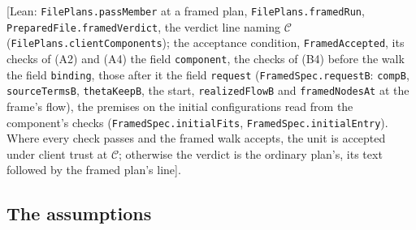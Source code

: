 \documentclass[10pt,a4paper]{article}
\theoremstyle{definition}
\theoremstyle{remark}
\newcommand{\lean}[1]{\texttt{\small #1}}
\newcommand{\status}[1]{\textsf{\small[#1]}}
\newcommand{\cC}{\mathcal{C}}
\begin{document}
\begin{description}[leftmargin=1.5em,style=nextline]
\status{Lean: \lean{FilePlans.passMember} at a framed plan, \lean{FilePlans.framedRun}, \lean{PreparedFile.framedVerdict}, the verdict line naming $\cC$ (\lean{FilePlans.clientComponents}); the acceptance condition, \lean{FramedAccepted}, its checks of (A2) and (A4) the field \lean{component}, the checks of (B4) before the walk the field \lean{binding}, those after it the field \lean{request} (\lean{FramedSpec.requestB}: \lean{compB}, \lean{sourceTermsB}, \lean{thetaKeepB}, the start, \lean{realizedFlowB} and \lean{framedNodesAt} at the frame's flow), the premises on the initial configurations read from the component's checks (\lean{FramedSpec.initialFits}, \lean{FramedSpec.initialEntry}). Where every check passes and the framed walk accepts, the unit is accepted under client trust at $\cC$; otherwise the verdict is the ordinary plan's, its text followed by the framed plan's line}.
\end{description}

\subsection{The assumptions}\label{sec:accept-trust}
\end{document}
